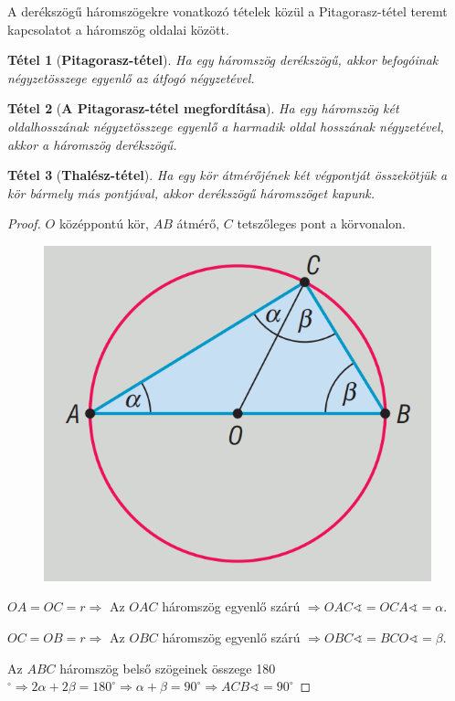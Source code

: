 \documentclass[12pt,a4paper]{article}
\newtheorem{theorem}{Tétel} [section]
\begin{document}
A derékszögű háromszögekre vonatkozó tételek közül a Pitagorasz-tétel teremt kapcsolatot a háromszög oldalai között.

\begin{theorem}[\textbf{Pitagorasz-tétel}]
Ha egy háromszög derékszögű, akkor befogóinak négyzetösszege egyenlő az átfogó négyzetével.
\end{theorem}
\begin{theorem}[\textbf{A Pitagorasz-tétel megfordítása}]
Ha egy háromszög két oldalhosszának négyzetösszege egyenlő a harmadik oldal hosszának négyzetével, akkor a háromszög derékszögű.
\end{theorem}
\begin{theorem}[\textbf{Thalész-tétel}]
Ha egy kör átmérőjének két végpontját összekötjük a kör bármely más pontjával, akkor derékszögű háromszöget kapunk.
\end{theorem}
\begin{proof}
$O$ középpontú kör, $AB$ átmérő, $C$ tetszőleges pont a körvonalon.
\begin{figure}[h]
\centering
\includegraphics[scale=0.3]{geometry/thales}
\end{figure}

$OA = OC = r \Rightarrow$ Az $OAC$ háromszög egyenlő szárú $\Rightarrow OAC\sphericalangle = OCA\sphericalangle = \alpha$.

$OC = OB = r \Rightarrow$ Az $OBC$ háromszög egyenlő szárú $\Rightarrow OBC\sphericalangle = BCO\sphericalangle = \beta$.

Az $ABC$ háromszög belső szögeinek összege 180$^\circ \Rightarrow 2\alpha+2\beta=180^\circ \Rightarrow \alpha+\beta = 90^\circ \Rightarrow ACB\sphericalangle = 90^\circ$
\end{proof}
\end{document}
